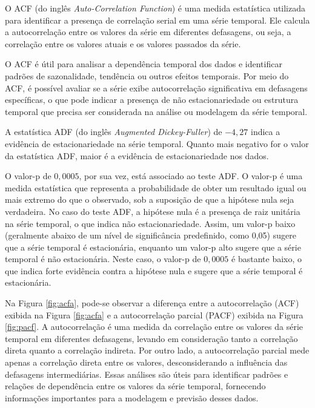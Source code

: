 O ACF (do inglês \textit{Auto-Correlation Function}) é uma medida estatística utilizada para identificar a presença de correlação serial em uma série temporal. Ele calcula a autocorrelação entre os valores da série em diferentes defasagens, ou seja, a correlação entre os valores atuais e os valores passados da série. 

O ACF é útil para analisar a dependência temporal dos dados e identificar padrões de sazonalidade, tendência ou outros efeitos temporais. Por meio do ACF, é possível avaliar se a série exibe autocorrelação significativa em defasagens específicas, o que pode indicar a presença de não estacionariedade ou estrutura temporal que precisa ser considerada na análise ou modelagem da série temporal.

A estatística ADF (do inglês \textit{Augmented Dickey-Fuller}) de $-4,27$ indica a evidência de estacionariedade na série temporal. Quanto mais negativo for o valor da estatística ADF, maior é a evidência de estacionariedade nos dados.

O valor-p de $0,0005$, por sua vez, está associado ao teste ADF. O valor-p é uma medida estatística que representa a probabilidade de obter um resultado igual ou mais extremo do que o observado, sob a suposição de que a hipótese nula seja verdadeira. No caso do teste ADF, a hipótese nula é a presença de raiz unitária na série temporal, o que indica não estacionariedade. Assim, um valor-p baixo (geralmente abaixo de um nível de significância predefinido, como 0,05) sugere que a série temporal é estacionária, enquanto um valor-p alto sugere que a série temporal é não estacionária. Neste caso, o valor-p de $0,0005$ é bastante baixo, o que indica forte evidência contra a hipótese nula e sugere que a série temporal é estacionária.

Na Figura \ref{fig:acfa}, pode-se observar a diferença entre a autocorrelação (ACF) exibida na Figura \ref{fig:acfa} e a autocorrelação parcial (PACF) exibida na Figura \ref{fig:pacf}. A autocorrelação é uma medida da correlação entre os valores da série temporal em diferentes defasagens, levando em consideração tanto a correlação direta quanto a correlação indireta. Por outro lado, a autocorrelação parcial mede apenas a correlação direta entre os valores, desconsiderando a influência das defasagens intermediárias. Essas análises são úteis para identificar padrões e relações de dependência entre os valores da série temporal, fornecendo informações importantes para a modelagem e previsão desses dados.

